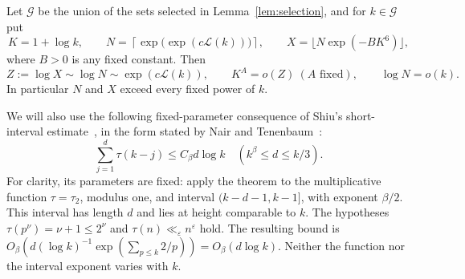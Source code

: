 \documentclass[11pt]{amsart}
\numberwithin{equation}{section}
\theoremstyle{remark}
\begin{document}
Let \(\mathcal G\) be the union of the sets selected in
Lemma~\ref{lem:selection}, and for \(k\in\mathcal G\) put
\begin{equation}\label{eq:NX}
 K=1+\log k,\qquad
 N=\left\lceil\exp\bigl(\exp(c\mathcal L(k))\bigr)\right\rceil,\qquad
 X=\lfloor N\exp(-B K^6)\rfloor ,
\end{equation}
where \(B>0\) is any fixed constant. Then
\begin{equation}\label{eq:scales}
 Z:=\log X\sim\log N\sim\exp(c\mathcal L(k)),\qquad
 K^A=o(Z)\ (A\text{ fixed}),\qquad \log N=o(k).
\end{equation}
In particular \(N\) and \(X\) exceed every fixed power of \(k\).

We will also use the following fixed-parameter consequence of
Shiu's short-interval estimate~\cite{Shiu}, in the form stated by
Nair and Tenenbaum~\cite[Introduction]{NT}:
\begin{equation}\label{eq:shiu}
 \sum_{j=1}^d\tau(k-j)\le C_\beta d\log k
 \quad(k^\beta\le d\le k/3).
\end{equation}
For clarity, its parameters are fixed: apply the theorem to the
multiplicative function \(\tau=\tau_2\), modulus one, and interval
\((k-d-1,k-1]\), with exponent \(\beta/2\).
This interval has length \(d\) and lies at height comparable to \(k\).
The hypotheses \(\tau(p^\nu)=\nu+1\le2^\nu\) and
\(\tau(n)\ll_\varepsilon n^\varepsilon\) hold.
The resulting bound is
\(O_\beta(d(\log k)^{-1}\exp(\sum_{p\le k}2/p))
=O_\beta(d\log k)\).
Neither the function nor the interval exponent varies with \(k\).
\end{document}
